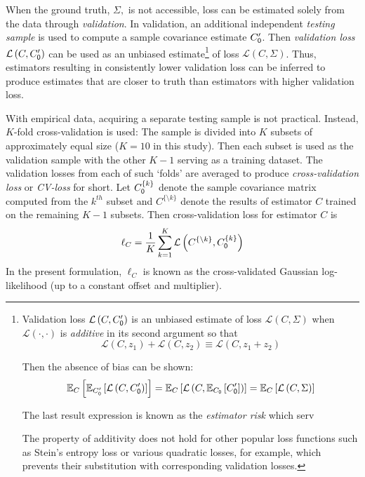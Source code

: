 \documentclass[10pt]{article}
\newcommand{\loss}[1]{\mathcal L\left(#1\right)}
\newcommand{\E}[2][]{\mathbb E_{#1}\left[ #2\right]}    %
\begin{document}
When the ground truth, $\Sigma,$ is not accessible, loss can be estimated solely from the data through \emph{validation}.  In validation, an additional independent \emph{testing sample} is used to compute a sample covariance estimate $C_{\sf 0}^\prime$.  Then \emph{validation loss} $\loss{C,C_{\sf 0}^\prime}$ can be used as an unbiased estimate\footnote
{
    Validation loss $\loss{C,C_{\sf 0}^\prime}$ is an unbiased estimate of loss $\loss{C,\Sigma}$ when $\loss{\cdot,\cdot}$ is \emph{additive} in its second argument so that 
 \begin{equation*}\label{eq:additivity}
 \loss{C,z_1} + \loss{C,z_2} \equiv \loss{C,z_1+z_2}
 \end{equation*}

Then the absence of bias can be shown:
\begin{equation*}
    \E[C]{\E[C_{\sf 0}^\prime]{\loss{C,C_{\sf 0}^\prime}}}=\E[C]{\loss{C,\E[C_{\sf 0}]{C_{\sf 0}^\prime}}}=\E[C]{\loss{C,\Sigma}}
\end{equation*}

The last result expression is known as the \emph{estimator risk} which serv

The property of additivity does not hold for other popular loss functions such as Stein's entropy loss or various quadratic losses, for example, which prevents their substitution with corresponding validation losses. 
} 
of loss $\loss{C,\Sigma}$.  Thus, estimators resulting in consistently lower validation loss can be inferred to produce estimates that are closer to truth than estimators with higher validation loss. 

With empirical data, acquiring a separate testing sample is not practical. Instead, $K$-fold cross-validation is used: The sample is divided into $K$ subsets of approximately equal size ($K=10$ in this study).  Then each subset is used as the validation sample with the other $K-1$ serving as a training dataset. The validation losses from each of such `folds' are averaged to produce \emph{cross-validation loss} or \emph{CV-loss} for short.  Let $C_{\sf 0}^{\{k\}}$ denote the sample covariance matrix computed from the $k^{th}$ subset and $C^{\{\setminus k\}}$ denote the results of estimator $C$ trained on the remaining $K-1$ subsets. Then cross-validation loss for estimator $C$ is
\begin{equation}\label{eq:cv-loss}
    \ell_C=\frac 1 K \sum\limits_{k=1}^K \loss{C^{\{\setminus k\}},C_{\sf 0}^{\{k\}}}
\end{equation}
In the present formulation, $\ell_C$ is known as the cross-validated Gaussian log-likelihood (up to a constant offset and multiplier).
\end{document}
